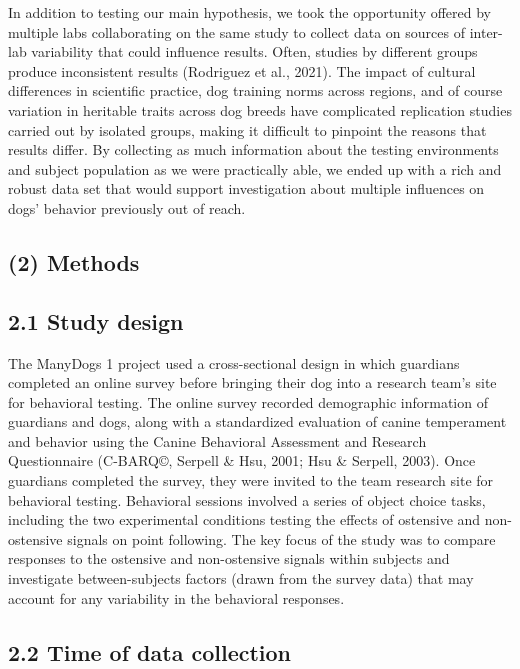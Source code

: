 \documentclass[
  man,floatsintext]{apa6}
\begin{document}
In addition to testing our main hypothesis, we took the opportunity offered by multiple labs collaborating on the same study to collect data on sources of inter-lab variability that could influence results. Often, studies by different groups produce inconsistent results (Rodriguez et al., 2021). The impact of cultural differences in scientific practice, dog training norms across regions, and of course variation in heritable traits across dog breeds have complicated replication studies carried out by isolated groups, making it difficult to pinpoint the reasons that results differ. By collecting as much information about the testing environments and subject population as we were practically able, we ended up with a rich and robust data set that would support investigation about multiple influences on dogs' behavior previously out of reach.~

\hypertarget{methods}{%
\subsection{(2) Methods}\label{methods}}

\hypertarget{study-design}{%
\subsection{2.1 Study design}\label{study-design}}

The ManyDogs 1 project used a cross-sectional design in which guardians completed an online survey before bringing their dog into a research team's site for behavioral testing. The online survey recorded demographic information of guardians and dogs, along with a standardized evaluation of canine temperament and behavior using the Canine Behavioral Assessment and Research Questionnaire (C-BARQ©, Serpell \& Hsu, 2001; Hsu \& Serpell, 2003). Once guardians completed the survey, they were invited to the team research site for behavioral testing. Behavioral sessions involved a series of object choice tasks, including the two experimental conditions testing the effects of ostensive and non-ostensive signals on point following. The key focus of the study was to compare responses to the ostensive and non-ostensive signals within subjects and investigate between-subjects factors (drawn from the survey data) that may account for any variability in the behavioral responses.

\hypertarget{time-of-data-collection}{%
\subsection{2.2 Time of data collection}\label{time-of-data-collection}}
\end{document}
